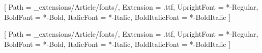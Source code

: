 \usepackage{tikz}
\usepackage{xcolor}
\usepackage{tabularx}
\usepackage{orcidlink}
\usepackage{lineno}
\usepackage{draftwatermark}
\usepackage{fontspec}
\usepackage{fvextra} %

\setmainfont{LiberationSans}[
  Path = _extensions/Article/fonts/,
  Extension = .ttf,
  UprightFont = *-Regular,
  BoldFont = *-Bold,
  ItalicFont = *-Italic,
  BoldItalicFont = *-BoldItalic
]

\setsansfont{LiberationSans}[
  Path = _extensions/Article/fonts/,
  Extension = .ttf,
  UprightFont = *-Regular,
  BoldFont = *-Bold,
  ItalicFont = *-Italic,
  BoldItalicFont = *-BoldItalic
]

